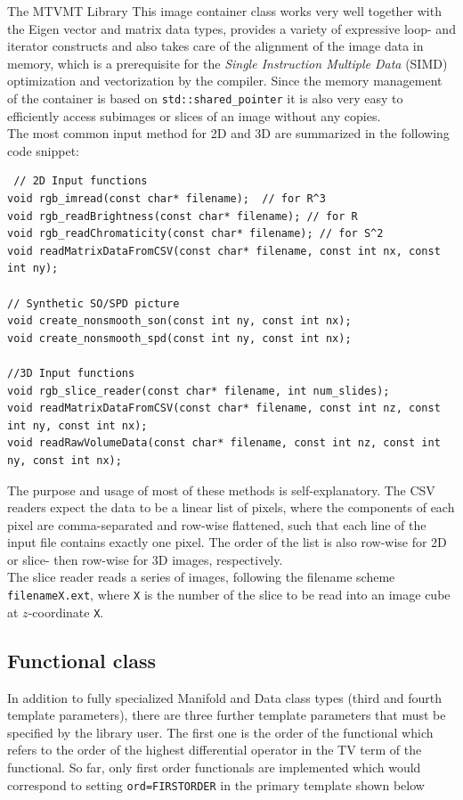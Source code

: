 \begin{chapter}{The MTVMT Library}
This image container class works very well together with the Eigen vector and matrix data types, provides a variety of expressive loop- and iterator constructs and also takes care
of the alignment of the image data in memory, which is a prerequisite for the \textit{Single Instruction Multiple Data} (SIMD) optimization and vectorization by the compiler.
Since the memory management of the container is based on \texttt{std::shared\_pointer} it is also very easy to efficiently access subimages or slices of an image without any copies.\\

The most common input method for 2D and 3D are summarized in the following code snippet:
\cppinline
\begin{lstlisting}
 // 2D Input functions
void rgb_imread(const char* filename);	// for R^3
void rgb_readBrightness(const char* filename); // for R
void rgb_readChromaticity(const char* filename); // for S^2
void readMatrixDataFromCSV(const char* filename, const int nx, const int ny);

// Synthetic SO/SPD picture 
void create_nonsmooth_son(const int ny, const int nx);
void create_nonsmooth_spd(const int ny, const int nx);
 
//3D Input functions
void rgb_slice_reader(const char* filename, int num_slides); 
void readMatrixDataFromCSV(const char* filename, const int nz, const int ny, const int nx);
void readRawVolumeData(const char* filename, const int nz, const int ny, const int nx);
\end{lstlisting}
The purpose and usage of most of these methods is self-explanatory. The CSV readers expect the data to be a linear list of pixels, where the components of each pixel are
comma-separated and row-wise flattened, such that each line of the input file contains exactly one pixel. The order of the list is also row-wise for 2D or slice- then row-wise for 3D images,
respectively. \\ 
The slice reader reads a series of images, following the filename scheme \texttt{filenameX.ext}, where \texttt{X} is the number of the slice to be read into an image cube at $z$-coordinate
\texttt{X}.

\subsection{Functional class} %
\label{sub:Functional class}
In addition to fully specialized Manifold and Data class types (third and fourth template parameters),
there are three further template parameters that must be specified by the library user. The first one
is the order of the functional which refers to the order of the highest differential operator in the TV term of the functional.
So far, only first order functionals are implemented which would correspond to setting \texttt{ord=FIRSTORDER} in the primary template shown below


\end{chapter}
